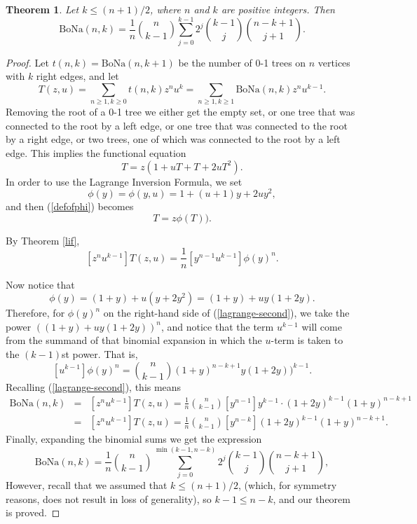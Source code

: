 \documentclass[10pt,a4paper]{amsart}
\newtheorem{theorem}{Theorem}
\newcommand{\bona}{\mathrm{BoNa}}
\begin{document}
\begin{theorem}  \label{explicit}
Let $k\leq (n+1)/2$, where $n$ and $k$ are positive integers. Then
\[\bona(n,k)=\frac{1}{n} {n\choose k-1} \sum_{j=0}^{k-1} 2^j {k-1\choose j}{n-k+1\choose j+1} .\]
\end{theorem}

\begin{proof} Let $t(n,k)=\bona(n,k+1)$ be the number of 0-1 trees on $n$ vertices with $k$ right edges, and let
\begin{equation} \label{bivariate-tree} T(z,u)=\sum_{n\geq 1,k\geq 0} t(n,k) z^n u^k = \sum_{n\geq 1,k\geq 1} \bona(n,k)z^n u^{k-1}. \end{equation} 
Removing the root of a 0-1 tree we either get the empty set, or one tree that was connected to the root by a left edge, or one tree that was connected to the
root by a right edge, or two trees, one of which was connected to the root by a left edge.  This implies the functional equation
\[T=z(1+uT+T+2uT^2).\]
In order to use the Lagrange Inversion Formula, we set 
\begin{equation} \label{defofphi} \phi(y)=\phi(y,u)=1+(u+1)y+2uy^2,\end{equation} and then (\ref{defofphi}) becomes
\begin{equation} \label{lagrange-first} T=z\phi(T)) .\end{equation} 

By Theorem \ref{lif}, 
\begin{equation} \label{lagrange-second} [z^nu^{k-1}] T(z,u)=\frac{1}{n}[y^{n-1}u^{k-1}] \phi(y)^n.\end{equation}

Now notice that 
\[\phi(y)=(1+y)+u(y+2y^2)=(1+y)+uy(1+2y) .\]
Therefore, for $\phi(y)^n$ on the right-hand side of (\ref{lagrange-second}), we take the power $((1+y)+uy(1+2y))^n$, and notice
that the term $u^{k-1}$ will come from the summand of that binomial expansion in which the $u$-term is taken to the $(k-1)$st power. 
That is, 
\[[u^{k-1}]\phi(y)^n = {n\choose k-1} (1+y)^{n-k+1}y(1+2y))^{k-1} .\] 
Recalling (\ref{lagrange-second}), this means
\begin{eqnarray*} \bona(n,k) & = & [z^nu^{k-1}]T(z,u)=\frac{1}{n} {n\choose k-1}[y^{n-1} ]y^{k-1}\cdot(1+2y)^{k-1} (1+y)^{n-k+1} \\
& = & [z^nu^{k-1}]T(z,u)=\frac{1}{n} {n\choose k-1}[y^{n-k} ](1+2y)^{k-1} (1+y)^{n-k+1}.\end{eqnarray*}
Finally, expanding the binomial sums we get the expression
\[\bona(n,k)=\frac{1}{n} {n\choose k-1} \sum_{j=0}^{\min(k-1,n-k)} 2^j {k-1\choose j}{n-k+1\choose j+1} ,\]
However, recall that we assumed that $k\leq (n+1)/2$, (which, for symmetry reasons, does not result in loss of generality), so 
$k-1\leq n-k$, and our theorem is proved.  
\end{proof}
\end{document}
